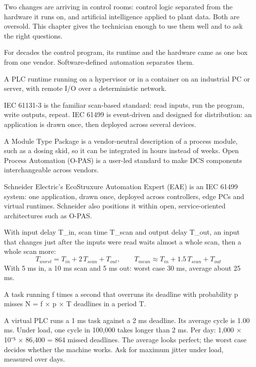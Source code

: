 Two changes are arriving in control rooms: control logic separated from the hardware it runs on, and artificial intelligence applied to plant data. Both are oversold. This chapter gives the technician enough to use them well and to ask the right questions.

For decades the control program, its runtime and the hardware came as one box from one vendor. Software-defined automation separates them.

 A PLC runtime running on a hypervisor or in a container on an industrial PC or server, with remote I/O over a deterministic network.

 IEC 61131-3 is the familiar scan-based standard: read inputs, run the program, write outputs, repeat. IEC 61499 is event-driven and designed for distribution: an application is drawn once, then deployed across several devices.

 A Module Type Package is a vendor-neutral description of a process module, such as a dosing skid, so it can be integrated in hours instead of weeks. Open Process Automation (O-PAS) is a user-led standard to make DCS components interchangeable across vendors.

 Schneider Electric's EcoStruxure Automation Expert (EAE) is an IEC 61499 system: one application, drawn once, deployed across controllers, edge PCs and virtual runtimes. Schneider also positions it within open, service-oriented architectures such as O-PAS.

 With input delay T\_in, scan time T\_scan and output delay T\_out, an input that changes just after the inputs were read waits almost a whole scan, then a whole scan more:
\[ T_{worst} = T_{in} + 2\,T_{scan} + T_{out}, \qquad T_{mean} \approx T_{in} + 1.5\,T_{scan} + T_{out} \]
With 5 ms in, a 10 ms scan and 5 ms out: worst case 30 ms, average about 25 ms.

 A task running f times a second that overruns its deadline with probability p misses N = f × p × T deadlines in a period T.

 A virtual PLC runs a 1 ms task against a 2 ms deadline. Its average cycle is 1.00 ms. Under load, one cycle in 100,000 takes longer than 2 ms. Per day: 1,000 × 10⁻⁵ × 86,400 = 864 missed deadlines. The average looks perfect; the worst case decides whether the machine works. Ask for maximum jitter under load, measured over days.

